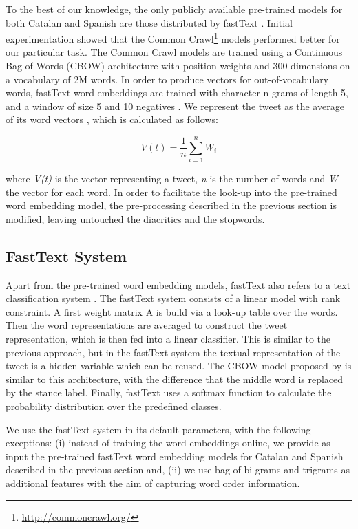 \documentclass[10pt, a4paper]{article}
\begin{document}
To the best of our knowledge, the only publicly available pre-trained models for both Catalan and Spanish are those distributed by fastText \cite{Grave18}. Initial experimentation showed that the Common Crawl\footnote{\url{http://commoncrawl.org/}} models performed better for our particular task. The Common Crawl models are trained using a Continuous Bag-of-Words (CBOW) architecture with position-weights and 300 dimensions on a vocabulary of 2M words. In order to produce vectors for out-of-vocabulary words, fastText word embeddings are trained with character n-grams of length 5, and a window of size 5 and 10 negatives \cite{Grave18}. We represent the tweet as the average of its word vectors \cite{DBLP:journals/corr/KenterBR16}, which is calculated as follows:

\[V(t)=\frac{1}{n}\sum_{i=1}^{n}W_{i}\]

where \textit{V(t)} is the vector representing a tweet, \textit{n} is the number of words and \textit{W} the vector for each word. In order to facilitate the look-up into the pre-trained word embedding model, the pre-processing described in the previous section is modified, leaving untouched the diacritics and the stopwords.

\subsection{FastText System}\label{sec:fasttext-system}

Apart from the pre-trained word embedding models, fastText also refers to a text classification system \cite{joulin-etal-2017-bag}. The fastText system consists of a linear model with rank constraint. A first weight matrix A is build via a look-up table over the words. Then the word representations are averaged to construct the tweet representation, which is then fed into a linear classifier. This is similar to the previous approach, but in the fastText system the textual representation of the tweet is a hidden variable which can be reused. The CBOW model proposed by \cite{mikolov2013b} is similar to this architecture, with the difference that the middle word is replaced by the stance label. Finally, fastText uses a softmax function to calculate the probability distribution over the predefined classes.

We use the fastText system in its default parameters, with the following exceptions: (i) instead of training the word embeddings online, we provide as input the pre-trained fastText word embedding models for Catalan and Spanish described in the previous section and, (ii) we use bag of bi-grams and trigrams as additional features with the aim of capturing word order information.
\end{document}
